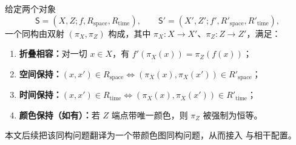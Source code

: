 \begin{definition}[时空结构同构]\label{def:spacetime_iso}
给定两个对象
$$
\mathsf S=(X,Z; f, R_{\mathrm{space}}, R_{\mathrm{time}}),\qquad
\mathsf S'=(X',Z'; f', R'_{\mathrm{space}}, R'_{\mathrm{time}}),
$$
一个同构由双射 $(\pi_X,\pi_Z)$ 构成，其中 $\pi_X:X\to X'$、$\pi_Z:Z\to Z'$，满足：
\begin{enumerate}
  \item \textbf{折叠相容：}对一切 $x\in X$，有 $f'(\pi_X(x))=\pi_Z(f(x))$；
  \item \textbf{空间保持：}$(x,x')\in R_{\mathrm{space}} \iff (\pi_X(x),\pi_X(x'))\in R'_{\mathrm{space}}$；
  \item \textbf{时间保持：}$(x,x')\in R_{\mathrm{time}} \iff (\pi_X(x),\pi_X(x'))\in R'_{\mathrm{time}}$；
  \item \textbf{颜色保持（如有）：}若 $Z$ 端点带唯一颜色，则 $\pi_Z$ 被强制为恒等。
\end{enumerate}
\end{definition}

本文后续把该同构问题翻译为一个带颜色图同构问题，从而接入 \WL{} 与相干配置。

